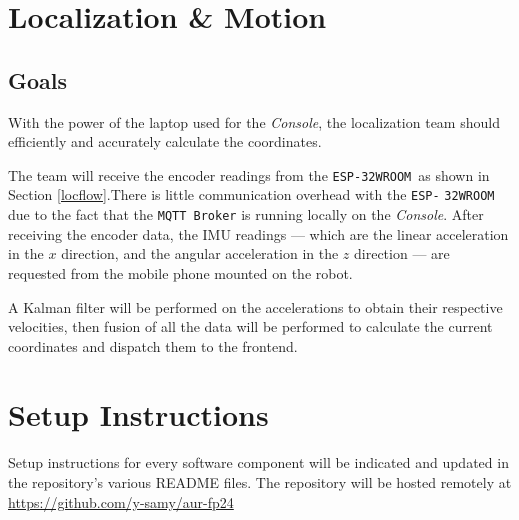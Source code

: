 \documentclass[a4paper,12pt]{article}
\newcommand{\esp}{\texttt{ESP-32WROOM}}
\newcommand{\con}{\textit{Console}}
\begin{document}
\section{Localization \& Motion}
\subsection*{Goals}

With the power of the laptop used for the \con, the localization team should efficiently and accurately calculate the coordinates.

The team will receive the encoder readings from the \esp\ as shown in Section \ref{locflow}.There is little communication overhead with the \texttt{ESP-} \texttt{32WROOM} due to the fact that the \texttt{MQTT Broker} is running locally on the \con.
After receiving the encoder data, the IMU readings --- which are the linear acceleration in the $x$ direction, and the angular acceleration in the $z$ direction --- are requested from the mobile phone mounted on the robot.

A Kalman filter will be performed on the accelerations to obtain their respective velocities, then fusion of all the data will be performed to calculate the current coordinates and dispatch them to the frontend.

\section{Setup Instructions}
Setup instructions for every software component will be indicated and updated in the repository's various README files.
The repository will be hosted remotely at \url{https://github.com/y-samy/aur-fp24}
\end{document}
